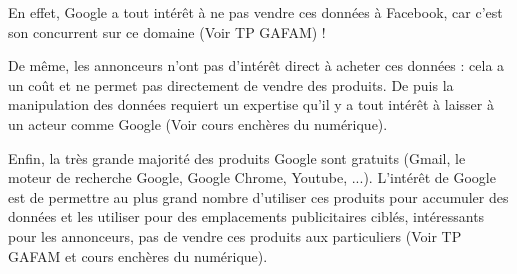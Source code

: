 \documentclass[addpoints]{exam}
\begin{document}
\begin{questions}
\begin{parts}
\begin{solution}
En effet, Google a tout intérêt à ne pas vendre ces données à Facebook, car c'est son concurrent sur ce domaine (Voir TP GAFAM) ! 

De même, les annonceurs n'ont pas d'intérêt direct à acheter ces données : cela a un coût et ne permet pas directement de vendre des produits. De puis la manipulation des données requiert un expertise qu'il y a tout intérêt à laisser à un acteur comme Google (Voir cours enchères du numérique). 

Enfin, la très grande majorité des produits Google sont gratuits (Gmail, le moteur de recherche Google, Google Chrome, Youtube, ...). L'intérêt de Google est de permettre au plus grand nombre d'utiliser ces produits pour accumuler des données et les utiliser pour des emplacements publicitaires ciblés, intéressants pour les annonceurs, pas de vendre ces produits aux particuliers (Voir TP GAFAM et cours enchères du numérique).
\end{solution}

\end{parts}
\end{questions}
\end{document}
